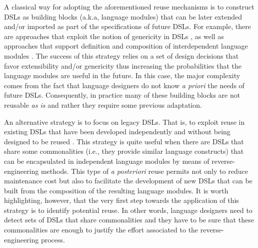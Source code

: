 A classical way for adopting the aforementioned reuse mechanisms is to construct DSLs as building blocks (a.k.a, language modules) that can be later extended and/or imported as part of the specifications of future DSLs. For example, there are approaches that exploit the notion of genericity in DSLs \cite{Rose:2013}, as well as approaches that support definition and composition of interdependent language modules \cite{Vacchi:2015,Mernik:2013,Rumpe:2010}. The success of this strategy relies on a set of design decisions that favor extensibility and/or genericity thus increasing the probabilities that the language modules are useful in the future. In this case, the major complexity comes from the fact that language designers do not know \textit{a priori} the needs of future DSLs. Consequently, in practice many of these building blocks are not reusable \textit{as is} and rather they require some previous adaptation.

An alternative strategy is to focus on legacy DSLs. That is, to exploit reuse in existing DSLs that have been developed independently and without being designed to be reused \cite{degueule:2015}. This strategy is quite useful when there are DSLs that share some commonalities (i.e., they provide similar language constructs) that can be encapsulated in independent language modules by means of reverse-engineering methods. This type of \textit{a posteriori} reuse permits not only to reduce maintenance cost but also to facilitate the development of new DSLs that can be built from the composition of the resulting language modules. It is worth highlighting, however, that the very first step towards the application of this strategy is to identify potential reuse. In other words, language designers need to detect sets of DSLs that share commonalities and they have to be sure that these commonalities are enough to justify the effort associated to the reverse-engineering process.


